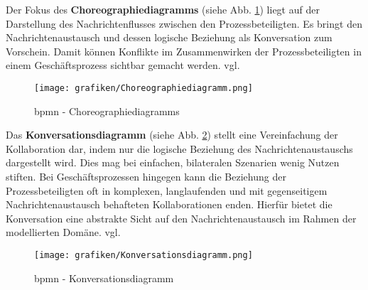 \newpage
\medskip\noindent Der Fokus des \textbf{Choreographiediagramms} (siehe Abb. \ref{fig:choreographiediagramm}) liegt auf der Darstellung des Nachrichtenflusses zwischen den Prozessbeteiligten. Es bringt den Nachrichtenaustausch und dessen logische Beziehung als Konversation zum Vorschein. Damit können Konflikte im Zusammenwirken der Prozessbeteiligten in einem Geschäftsprozess sichtbar gemacht werden. vgl.\cite[S.315]{ObjectManagementGroup.2011}

\begin{figure}[!h]
	\caption{bpmn - Choreographiediagramms}
	\centering
		\texttt{[image: grafiken/Choreographiediagramm.png]}	
	\label{fig:choreographiediagramm}
\end{figure}

\medskip\noindent Das \textbf{Konversationsdiagramm} (siehe Abb. \ref{fig:konversationsdiagramm}) stellt eine Vereinfachung der Kollaboration dar, indem nur die logische Beziehung des Nachrichtenaustauschs dargestellt wird. Dies mag bei einfachen, bilateralen Szenarien wenig Nutzen stiften. Bei Geschäftsprozessen hingegen kann die Beziehung der Prozessbeteiligten oft in komplexen, langlaufenden und mit gegenseitigem Nachrichtenaustausch behafteten Kollaborationen enden. Hierfür bietet die Konversation eine abstrakte Sicht auf den Nachrichtenaustausch im Rahmen der modellierten Domäne. vgl.\cite[S.124-126]{ObjectManagementGroup.2011}
\begin{figure}[!h]
	\caption{bpmn - Konversationsdiagramm}
	\centering
		\texttt{[image: grafiken/Konversationsdiagramm.png]}	
	\label{fig:konversationsdiagramm}
\end{figure}
